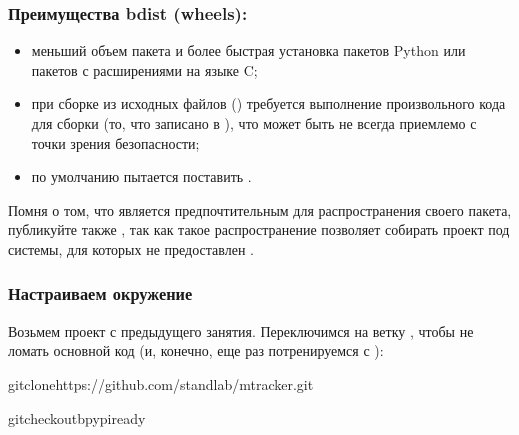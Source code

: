 \documentclass[letterpaper,10pt,russian]{sphinxmanual}
\begin{document}
\subsubsection{Преимущества bdist (wheels):}
\label{\detokenize{educational_materials/packaging/content:bdist-wheels}}\begin{itemize}
\item {} 
\sphinxAtStartPar
меньший объем пакета и более быстрая установка пакетов Python или пакетов с расширениями на языке C;

\item {} 
\sphinxAtStartPar
при сборке из исходных файлов () требуется выполнение произвольного кода для сборки (то, что записано в ), что может быть не всегда приемлемо с точки зрения безопасности;

\item {} 
\sphinxAtStartPar
по умолчанию  пытается поставить .

\end{itemize}

\sphinxAtStartPar
Помня о том, что  является предпочтительным для распространения своего пакета, публикуйте также , так как такое распространение позволяет собирать проект под системы, для которых не предоставлен .


\subsubsection{Настраиваем окружение}
\label{\detokenize{educational_materials/packaging/content:id3}}
\sphinxAtStartPar
Возьмем проект  с предыдущего занятия. Переключимся на ветку , чтобы не ломать основной код (и, конечно, еще раз потренируемся с ):

\begin{sphinxVerbatim}[commandchars=\\\{\}]
gitclonehttps://github.com/standlab/mtracker.git

gitcheckout\PYGZhy{}bpypi\PYGZus{}ready
\end{sphinxVerbatim}
\end{document}
